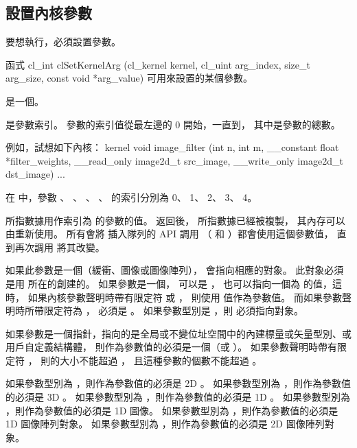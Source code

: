 \subsection{設置內核參數}

要想執行，必須設置參數。

函式
\startCLFUNC
cl_int clSetKernelArg (cl_kernel kernel,
			cl_uint arg_index,
			size_t arg_size,
			const void *arg_value)
\stopCLFUNC
可用來設置的某個參數。

 是一個。

 是參數索引。
參數的索引值從最左邊的 0 開始，一直到，
其中是參數的總數。

例如，試想如下內核：
\startclc
kernel void
image_filter (int n, int m,
		__constant float *filter_weights,
		__read_only image2d_t src_image,
		__write_only image2d_t dst_image)
{
	...
}
\stopclc

在  中，參數 、 、 、
 、  的索引分別為 0、 1、 2、 3、 4。

 所指數據用作索引為  的參數的值。
 返回後，  所指數據已經被複製，
其內存可以由重新使用。
所有會將  插入隊列的 API 調用
（  和 ）都會使用這個參數值，
直到再次調用  將其改變。

如果此參數是一個（緩衝、圖像或圖像陣列），
  會指向相應的對象。
此對象必須是用  所在的創建的。
如果參數是一個，  可以是 ，
也可以指向一個為  的值，這時，
如果內核參數聲明時帶有限定符  或 ，
則使用  值作為參數值。
而如果參數聲明時所帶限定符為 ，  必須是 。
如果參數型別是 ，則  必須指向對象。

如果參數是一個指針，指向的是全局或不變位址空間中的內建標量或矢量型別、或用戶自定義結構體，
則作為參數值的必須是一個（或 ）。
如果參數聲明時帶有限定符 ，
則的大小不能超過 ，
且這種參數的個數不能超過 。

如果參數型別為 ，則作為參數值的必須是 2D 。
如果參數型別為 ，則作為參數值的必須是 3D 。
如果參數型別為 ，則作為參數值的必須是 1D 。
如果參數型別為 ，則作為參數值的必須是 1D 圖像。
如果參數型別為 ，則作為參數值的必須是 1D 圖像陣列對象。
如果參數型別為 ，則作為參數值的必須是 2D 圖像陣列對象。

